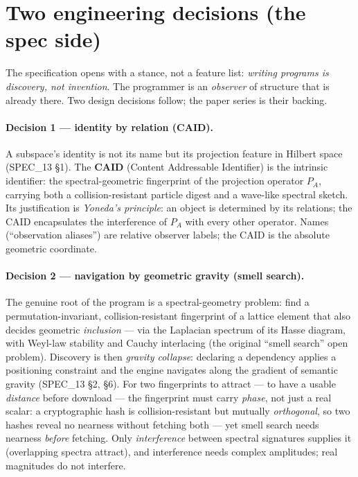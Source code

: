 \documentclass[11pt,a4paper]{article}
\theoremstyle{plain}
\theoremstyle{definition}
\theoremstyle{remark}
\begin{document}
\section{Two engineering decisions (the spec side)}

The specification opens with a stance, not a feature list: \emph{writing programs
is discovery, not invention}. The programmer is an \emph{observer} of structure
that is already there. Two design decisions follow; the paper series is their
backing.

\paragraph{Decision 1 --- identity by relation (CAID).}
A subspace's identity is not its name but its projection feature in Hilbert space
(SPEC\_13 \S1). The \textbf{CAID} (Content Addressable Identifier) is the
intrinsic identifier: the spectral-geometric fingerprint of the projection
operator $P_A$, carrying both a collision-resistant particle digest and a
wave-like spectral sketch. Its justification is \emph{Yoneda's principle}: an
object is determined by its relations; the CAID encapsulates the interference of
$P_A$ with every other operator. Names (``observation aliases'') are relative
observer labels; the CAID is the absolute geometric coordinate.

\paragraph{Decision 2 --- navigation by geometric gravity (smell search).}
The genuine root of the program is a spectral-geometry problem: find a
permutation-invariant, collision-resistant fingerprint of a lattice element that
also decides geometric \emph{inclusion} --- via the Laplacian spectrum of its
Hasse diagram, with Weyl-law stability and Cauchy interlacing (the original
``smell search'' open problem). Discovery is then \emph{gravity collapse}:
declaring a dependency applies a positioning constraint and the engine navigates
along the gradient of semantic gravity (SPEC\_13 \S2, \S6). For two fingerprints
to attract --- to have a usable \emph{distance} before download --- the
fingerprint must carry \emph{phase}, not just a real scalar: a cryptographic hash
is collision-resistant but mutually \emph{orthogonal}, so two hashes reveal no
nearness without fetching both --- yet smell search needs nearness \emph{before}
fetching. Only \emph{interference} between spectral signatures supplies it
(overlapping spectra attract), and interference needs complex amplitudes; real
magnitudes do not interfere.
\end{document}
